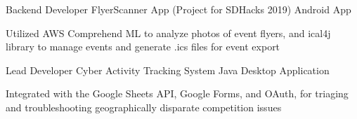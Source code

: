

\begin{cventries}

  \cventry
    {Backend Developer} %
    {FlyerScanner App (Project for SDHacks 2019)} %
    {Android App} %
    {} %
    {
      \begin{cvitems} %
        \item {Utilized AWS Comprehend ML to analyze photos of event flyers, and ical4j library to manage events and generate .ics files for event export}
      \end{cvitems}
    }
    
  \cventry
    {Lead Developer} %
    {Cyber Activity Tracking System} %
    {Java Desktop Application} %
    {} %
    {
      \begin{cvitems} %
        \item {Integrated with the Google Sheets API, Google Forms, and OAuth, for triaging and troubleshooting geographically disparate competition issues}
      \end{cvitems}
    }
    
\end{cventries}